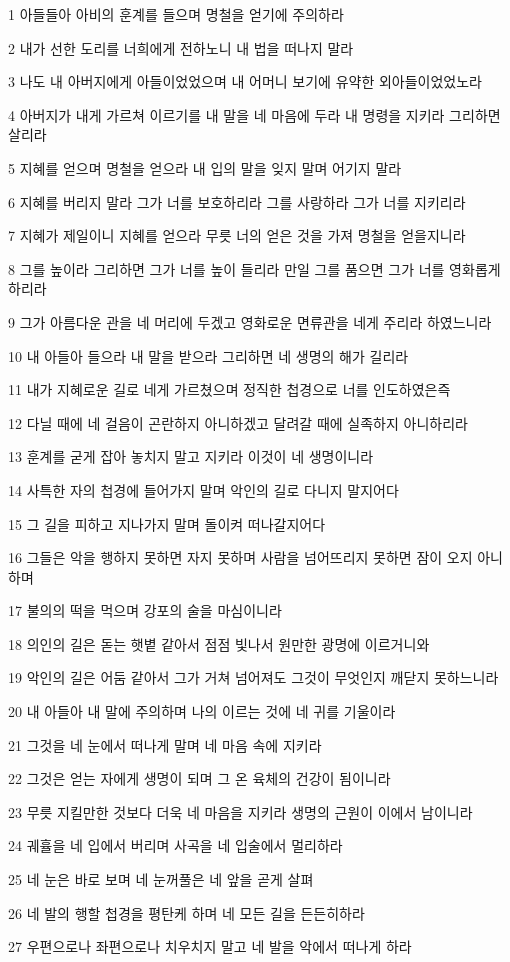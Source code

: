 \par 1 아들들아 아비의 훈계를 들으며 명철을 얻기에 주의하라
\par 2 내가 선한 도리를 너희에게 전하노니 내 법을 떠나지 말라
\par 3 나도 내 아버지에게 아들이었었으며 내 어머니 보기에 유약한 외아들이었었노라
\par 4 아버지가 내게 가르쳐 이르기를 내 말을 네 마음에 두라 내 명령을 지키라 그리하면 살리라
\par 5 지혜를 얻으며 명철을 얻으라 내 입의 말을 잊지 말며 어기지 말라
\par 6 지혜를 버리지 말라 그가 너를 보호하리라 그를 사랑하라 그가 너를 지키리라
\par 7 지혜가 제일이니 지혜를 얻으라 무릇 너의 얻은 것을 가져 명철을 얻을지니라
\par 8 그를 높이라 그리하면 그가 너를 높이 들리라 만일 그를 품으면 그가 너를 영화롭게 하리라
\par 9 그가 아름다운 관을 네 머리에 두겠고 영화로운 면류관을 네게 주리라 하였느니라
\par 10 내 아들아 들으라 내 말을 받으라 그리하면 네 생명의 해가 길리라
\par 11 내가 지혜로운 길로 네게 가르쳤으며 정직한 첩경으로 너를 인도하였은즉
\par 12 다닐 때에 네 걸음이 곤란하지 아니하겠고 달려갈 때에 실족하지 아니하리라
\par 13 훈계를 굳게 잡아 놓치지 말고 지키라 이것이 네 생명이니라
\par 14 사특한 자의 첩경에 들어가지 말며 악인의 길로 다니지 말지어다
\par 15 그 길을 피하고 지나가지 말며 돌이켜 떠나갈지어다
\par 16 그들은 악을 행하지 못하면 자지 못하며 사람을 넘어뜨리지 못하면 잠이 오지 아니하며
\par 17 불의의 떡을 먹으며 강포의 술을 마심이니라
\par 18 의인의 길은 돋는 햇볕 같아서 점점 빛나서 원만한 광명에 이르거니와
\par 19 악인의 길은 어둠 같아서 그가 거쳐 넘어져도 그것이 무엇인지 깨닫지 못하느니라
\par 20 내 아들아 내 말에 주의하며 나의 이르는 것에 네 귀를 기울이라
\par 21 그것을 네 눈에서 떠나게 말며 네 마음 속에 지키라
\par 22 그것은 얻는 자에게 생명이 되며 그 온 육체의 건강이 됨이니라
\par 23 무릇 지킬만한 것보다 더욱 네 마음을 지키라 생명의 근원이 이에서 남이니라
\par 24 궤휼을 네 입에서 버리며 사곡을 네 입술에서 멀리하라
\par 25 네 눈은 바로 보며 네 눈꺼풀은 네 앞을 곧게 살펴
\par 26 네 발의 행할 첩경을 평탄케 하며 네 모든 길을 든든히하라
\par 27 우편으로나 좌편으로나 치우치지 말고 네 발을 악에서 떠나게 하라

